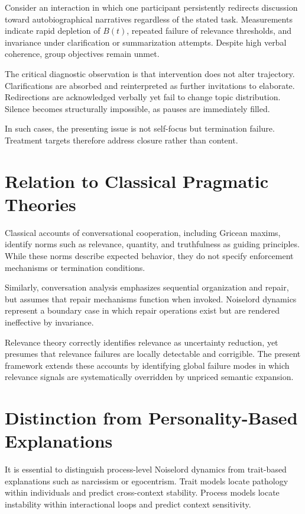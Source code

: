 \documentclass[12pt]{article}
\theoremstyle{remark}
\begin{document}
Consider an interaction in which one participant persistently redirects discussion toward autobiographical narratives regardless of the stated task. Measurements indicate rapid depletion of $B(t)$, repeated failure of relevance thresholds, and invariance under clarification or summarization attempts. Despite high verbal coherence, group objectives remain unmet.

The critical diagnostic observation is that intervention does not alter trajectory. Clarifications are absorbed and reinterpreted as further invitations to elaborate. Redirections are acknowledged verbally yet fail to change topic distribution. Silence becomes structurally impossible, as pauses are immediately filled.

In such cases, the presenting issue is not self-focus but termination failure. Treatment targets therefore address closure rather than content.

\section{Relation to Classical Pragmatic Theories}

Classical accounts of conversational cooperation, including Gricean maxims, identify norms such as relevance, quantity, and truthfulness as guiding principles. While these norms describe expected behavior, they do not specify enforcement mechanisms or termination conditions.

Similarly, conversation analysis emphasizes sequential organization and repair, but assumes that repair mechanisms function when invoked. Noiselord dynamics represent a boundary case in which repair operations exist but are rendered ineffective by invariance.

Relevance theory correctly identifies relevance as uncertainty reduction, yet presumes that relevance failures are locally detectable and corrigible. The present framework extends these accounts by identifying global failure modes in which relevance signals are systematically overridden by unpriced semantic expansion.

\section{Distinction from Personality-Based Explanations}

It is essential to distinguish process-level Noiselord dynamics from trait-based explanations such as narcissism or egocentrism. Trait models locate pathology within individuals and predict cross-context stability. Process models locate instability within interactional loops and predict context sensitivity.
\end{document}
